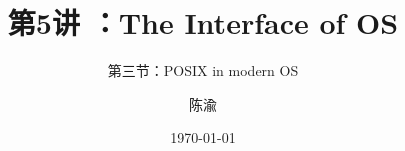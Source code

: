 


\title[第5讲]{第5讲 ：The Interface of OS} %
\subtitle{第三节：POSIX in modern OS}
\author{陈渝} %
\date{\today} %




\begin{frame}
\titlepage %
\end{frame}

